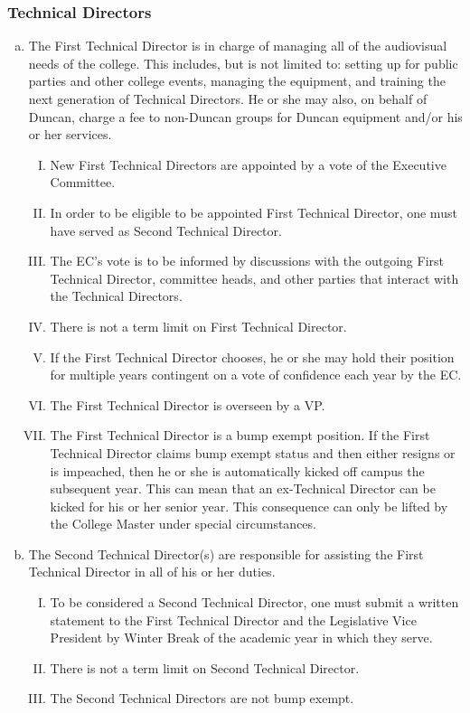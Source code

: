 \documentclass[USletter,12pt]{article}
\begin{document}
\subsubsection{Technical Directors}
\begin{enumerate}[(a)]
\item The First Technical Director is in charge of managing all of the audiovisual needs of the college.  This includes, but is not limited to: setting up for public parties and other college events, managing the equipment, and training the next generation of Technical Directors.  He or she may also, on behalf of Duncan, charge a fee to non-Duncan groups for Duncan equipment and/or his or her services.
	\begin{enumerate}[(I)]
	\item New First Technical Directors are appointed by a vote of the Executive Committee.
	\item In order to be eligible to be appointed First Technical Director, one must have served as Second Technical Director.
	\item The EC's vote is to be informed by discussions with the outgoing First Technical Director, committee heads, and other parties that interact with the Technical Directors.
	\item There is not a term limit on First Technical Director.
	\item If the First Technical Director chooses, he or she may hold their position for multiple years contingent on a vote of confidence each year by the EC.
	\item The First Technical Director is overseen by a VP.
	\item The First Technical Director is a bump exempt position.  If the First Technical Director claims bump exempt status and then either resigns or is impeached, then he or she is automatically kicked off campus the subsequent year.  This can mean that an ex-Technical Director can be kicked for his or her senior year.  This consequence can only be lifted by the College Master under special circumstances.
	\end{enumerate}
\item The Second Technical Director(s) are responsible for assisting the First Technical Director in all of his or her duties.
	\begin{enumerate}[(I)]
	\item To be considered a Second Technical Director, one must submit a written statement to the First Technical Director and the Legislative Vice President by Winter Break of the academic year in which they serve.
	\item There is not a term limit on Second Technical Director.
	\item The Second Technical Directors are not bump exempt.
	\end{enumerate}
\end{enumerate}
\end{document}
